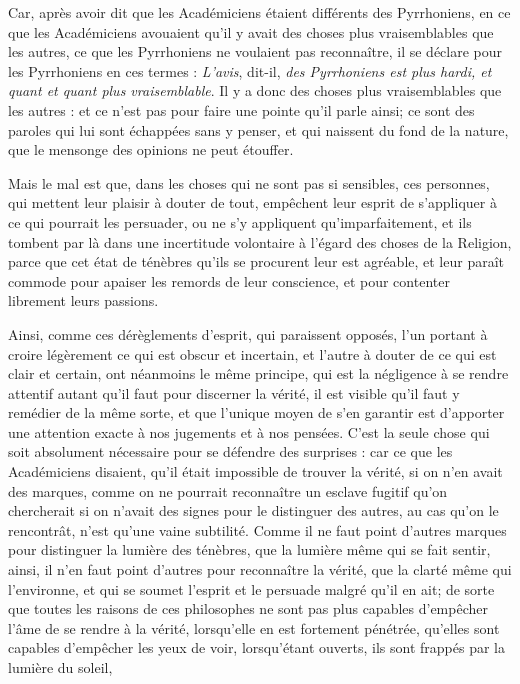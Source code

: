 Car, après avoir dit que les Académiciens étaient différents des Pyrrhoniens, en ce que les Académiciens avouaient qu'il y avait des choses plus vraisemblables que les autres, ce que les Pyrrhoniens ne voulaient pas reconnaître, il se déclare pour les Pyrrhoniens en ces termes : \emph{L'avis}, dit-il, \emph{des Pyrrhoniens est plus hardi, et quant et quant plus vraisemblable}. Il y a donc des choses plus vraisemblables que les autres : et ce n'est pas pour faire une pointe qu'il parle ainsi; ce sont des paroles qui lui sont échappées sans y penser, et qui naissent du fond de la nature, que le mensonge des opinions ne peut étouffer.

Mais le mal est que, dans les choses qui ne sont pas si sensibles, ces personnes, qui mettent leur plaisir à douter de tout, empêchent leur esprit de s'appliquer à ce qui pourrait les persuader, ou ne s'y appliquent qu'imparfaitement, et ils tombent par là dans une incertitude volontaire à l'égard des choses de la Religion, parce que cet état de ténèbres qu'ils se procurent leur est agréable, et leur paraît commode pour apaiser les remords de leur conscience, et pour contenter librement leurs passions.

Ainsi, comme ces dérèglements d'esprit, qui paraissent opposés, l'un portant à croire légèrement ce qui est obscur et incertain, et l'autre à douter de ce qui est clair et certain, ont néanmoins le même principe, qui est la négligence à se rendre attentif autant qu'il faut pour discerner la vérité, il est visible qu'il faut y remédier de la même sorte, et que l'unique moyen de s'en garantir est d'apporter une attention exacte à nos jugements et à nos pensées. C'est la seule chose qui soit absolument nécessaire pour se défendre des surprises : car ce que les Académiciens disaient, qu'il était impossible de trouver la vérité, si on n'en avait des marques, comme on ne pourrait reconnaître un esclave fugitif qu'on chercherait si on n'avait des signes pour le distinguer des autres, au cas qu'on le rencontrât, n'est qu'une vaine subtilité. Comme il ne faut point d'autres marques pour distinguer la lumière des ténèbres, que la lumière même qui se fait sentir, ainsi, il n'en faut point d'autres pour reconnaître la vérité, que la clarté même qui l'environne, et qui se soumet l'esprit et le persuade malgré qu'il en ait; de sorte que toutes les raisons de ces philosophes ne sont pas plus capables d'empêcher l'âme de se rendre à la vérité, lorsqu'elle en est fortement pénétrée, qu'elles sont capables d'empêcher les yeux de voir, lorsqu'étant ouverts, ils sont frappés par la lumière du soleil,

